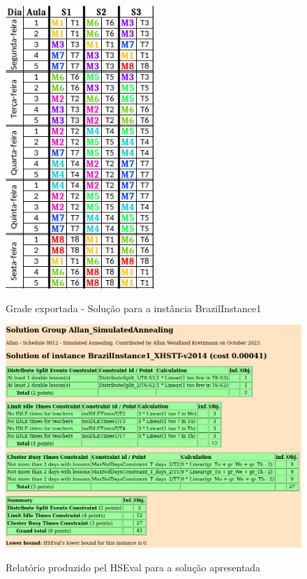 \begin{figure}[h]
	\centering
	\caption{Grade exportada - Solução para a instância BrazilInstance1}
	\includegraphics[width=0.5\textwidth]{./dados/figuras/brazilinstance1}
	\label{fig:brazilinstance1_solucao}
\end{figure}

\begin{figure}[h]
	\centering
	\caption{Relatório produzido pel HSEval para a solução apresentada}
	\includegraphics[width=1\textwidth]{./dados/figuras/hseval_brazilinstance1}
	\label{fig:hseval_brazilinstance1}
\end{figure}

